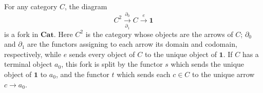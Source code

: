 For any category $C$, the diagram
$$C^2 \xrightarrow[\partial_1]{\partial_0} C \xrightarrow{e} \mathbf{1}$$
is a fork in $\mathbf{Cat}$. Here $C^2$ is the category whose objects are the arrows of $C$; $\partial_0$ and $\partial_1$ are the functors assigning to each arrow its domain and codomain, respectively, while $e$ sends every object of $C$ to the unique object of $\mathbf{1}$.
If $C$ has a terminal object $a_0$, this fork is split by the functor $s$ which sends the unique object of $\mathbf{1}$ to $a_0$, and the functor $t$ which sends each $c \in C$ to the unique arrow $c \to a_0$.
